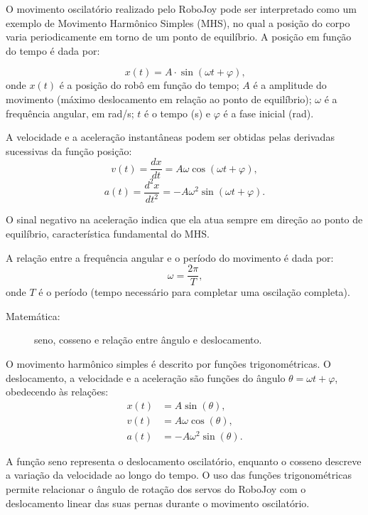 \documentclass[portuguese]{textolivre}
\begin{document}
O movimento oscilatório realizado pelo RoboJoy pode ser interpretado como um exemplo de Movimento Harmônico Simples (MHS), no qual a posição do corpo varia periodicamente em torno de um ponto de equilíbrio. A posição em função do tempo é dada por:

\begin{equation}
	x(t) = A \cdot \sin(\omega t + \varphi) \text{,}
\end{equation}
onde $x(t)$ é a posição do robô em função do tempo; 
$A$ é a amplitude do movimento (máximo deslocamento em relação ao ponto de equilíbrio); 
$\omega$ é a frequência angular, em rad/s; 
$t$ é o tempo (s) e
$\varphi$ é a fase inicial (rad).

A velocidade e a aceleração instantâneas podem ser obtidas pelas derivadas sucessivas da função posição:
\begin{equation}
	v(t) = \frac{dx}{dt} = A \omega \cos(\omega t + \varphi) ,
\end{equation}
\begin{equation}
	a(t) = \frac{d^2x}{dt^2} = -A \omega^2 \sin(\omega t + \varphi) .
\end{equation}

O sinal negativo na aceleração indica que ela atua sempre em direção ao ponto de equilíbrio, característica fundamental do MHS.

A relação entre a frequência angular e o período do movimento é dada por:
\begin{equation}
	\omega = \frac{2\pi}{T} \text{,}
\end{equation}
onde
$T$ é o período (tempo necessário para completar uma oscilação completa).

\begin{description}
    \item[Matemática:] seno, cosseno e relação entre ângulo e deslocamento.
\end{description}

O movimento harmônico simples é descrito por funções trigonométricas. O deslocamento, a velocidade e a aceleração são funções do ângulo $\theta = \omega t + \varphi$, obedecendo às relações:
\begin{align}
	x(t) &= A \sin(\theta), \\
	v(t) &= A \omega \cos(\theta),\\
	a(t) &= -A \omega^2 \sin(\theta).
\end{align}

A função seno representa o deslocamento oscilatório, enquanto o cosseno descreve a variação da velocidade ao longo do tempo. O uso das funções trigonométricas permite relacionar o ângulo de rotação dos servos do RoboJoy com o deslocamento linear das suas pernas durante o movimento oscilatório.
\end{document}
